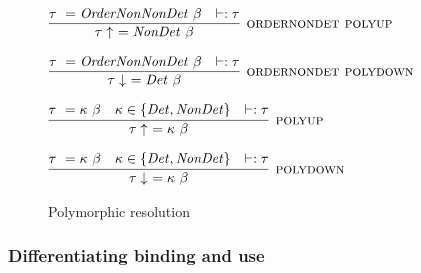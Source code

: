 
\begin{figure}
    $\infer[\rulename{ordernondet polyup}]
    {\tau \uparrow \ = \|NonDet \ \beta|}
    {\tau \ = \|OrderNonNonDet \ \beta|
        & \wellformed{\tau}
    }$

    \bigskip

    $\infer[\rulename{ordernondet polydown}]
    {\tau \downarrow \ = \|Det \ \beta|}
    {\tau \ = \|OrderNonNonDet \ \beta|
        & \wellformed{\tau}
    }$

    \bigskip
    
    $\infer[\rulename{polyup}]
    {\tau \uparrow \ = \kappa \ \beta}
    {\tau \ =\kappa \ \beta
        & \kappa \in \{\|Det, NonDet|\}
        & \wellformed{\tau}
    }$
    
    \bigskip
    
    $\infer[\rulename{polydown}]
    {\tau \downarrow \ = \kappa \ \beta}
    {\tau \ =\kappa \ \beta
        & \kappa \in \{\|Det, NonDet|\}
        & \wellformed{\tau}
    }$
\caption{Polymorphic resolution}
\label{tab-poly-resolutions}
\end{figure}

\subsubsection{Differentiating binding and use}\label{bindings-uses}

